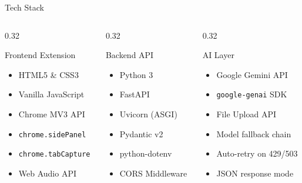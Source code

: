 \documentclass[aspectratio=169]{beamer}
\begin{document}
\begin{frame}{Tech Stack}
  \begin{columns}[T]
    \begin{column}{0.32\textwidth}
      \begin{block}{Frontend Extension}
        \begin{itemize}
          \item HTML5 \& CSS3
          \item Vanilla JavaScript
          \item Chrome MV3 API
          \item \texttt{chrome.sidePanel}
          \item \texttt{chrome.tabCapture}
          \item Web Audio API
        \end{itemize}
      \end{block}
    \end{column}
    \begin{column}{0.32\textwidth}
      \begin{block}{Backend API}
        \begin{itemize}
          \item Python 3
          \item FastAPI
          \item Uvicorn (ASGI)
          \item Pydantic v2
          \item python-dotenv
          \item CORS Middleware
        \end{itemize}
      \end{block}
    \end{column}
    \begin{column}{0.32\textwidth}
      \begin{block}{AI Layer}
        \begin{itemize}
          \item Google Gemini API
          \item \texttt{google-genai} SDK
          \item File Upload API
          \item Model fallback chain
          \item Auto-retry on 429/503
          \item JSON response mode
        \end{itemize}
      \end{block}
    \end{column}
  \end{columns}
\end{frame}
\end{document}
